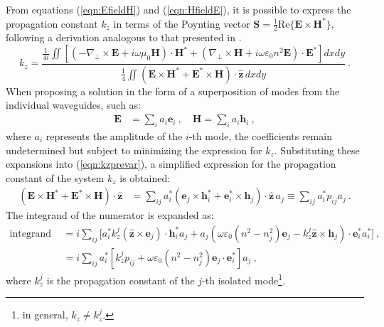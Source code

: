 From equations (\ref{eqn:EfieldH}) and (\ref{eqn:HfieldE}), it is possible to express the propagation constant $k_z$ in terms of the Poynting vector $\textbf{S} = \frac{1}{2} \text{Re}\{\textbf{E} \times \textbf{H}^*\}$, following a derivation analogous to that presented in \citep{haus_coupled-mode}. 
\begin{equation}
	k_z = \frac{
		\frac{1}{4i} \iint \left[
		\left(-\nabla_\perp \times \textbf{E} + i\omega \mu_0 \textbf{H}\right) \cdot \textbf{H}^* 
		+ \left(\nabla_\perp \times \textbf{H} + i\omega \varepsilon_0 n^2 \textbf{E}\right) \cdot \textbf{E}^*
		\right] dxdy
	}{
		\frac{1}{4} \iint \left( 
		\textbf{E} \times \textbf{H}^* + \textbf{E}^* \times \textbf{H}
		\right) \cdot \hat{\textbf{z}} \, dxdy
	} \ . 
	\label{eqn:kzprevar}
\end{equation}
When proposing a solution in the form of a superposition of modes from the individual waveguides, such as:
\begin{align*}
	\textbf{E} &= \sum_i a_i \textbf{e}_i \ , \quad \textbf{H} = \sum_i a_i \textbf{h}_i \ ,
\end{align*}
where $a_i$ represents the amplitude of the $i$-th mode, the coefficients remain undetermined but subject to minimizing the expression for $k_z$. Substituting these expansions into (\ref{eqn:kzprevar}), a simplified expression for the propagation constant of the system $k_z$ is obtained:
\begin{align*}
	(\textbf{E}\times\textbf{H}^* + \textbf{E}^*\times\textbf{H})\cdot\hat{\textbf{z}} 
	&= \sum_{ij} a_i^* \left( \textbf{e}_j \times \textbf{h}_i^* + \textbf{e}_i^* \times \textbf{h}_j \right) \cdot \hat{\textbf{z}} \, a_j 
	\equiv \sum_{ij} a_i^* p_{ij} a_j \ .
\end{align*}
The integrand of the numerator is expanded as:
\begin{align*}
	\text{integrand of the numerator} &= i\sum_{ij} \Big[ a_i^* k_z^j (\hat{\textbf{z}}\times\textbf{e}_j )\cdot\textbf{h}_i^* a_j  + a_j \left(\omega \varepsilon_0 (n^2-n_j^2) \textbf{e}_j - k_z^j \hat{\textbf{z}}\times\textbf{h}_j \right) \cdot \textbf{e}_i^* a_i^* \Big] \ , \\
	&= i\sum_{ij} a_i^* \left[ k_z^j p_{ij} + \omega \varepsilon_0(n^2-n_j^2) \textbf{e}_j \cdot \textbf{e}_i^* \right] a_j \ ,
\end{align*}
where $k_z^j$ is the propagation constant of the $j$-th isolated mode\footnote{in general, $k_z \neq k_z^j$.}. 

